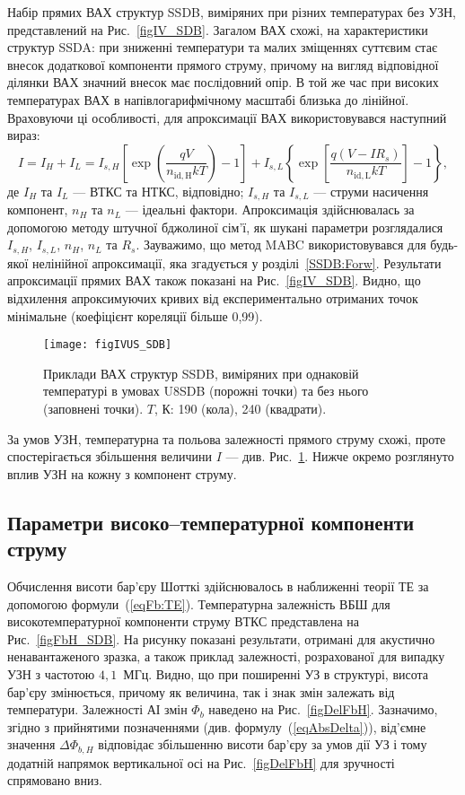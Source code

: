 Набір прямих ВАХ структур  SSDB, виміряних при різних температурах без УЗН, представлений на Рис.~\ref{figIV_SDB}.
Загалом ВАХ схожі, на характеристики структур SSDA:
при зниженні температури та малих зміщеннях суттєвим стає внесок додаткової компоненти прямого струму, причому
на вигляд відповідної ділянки ВАХ значний внесок має послідовний опір.
В той же час при високих температурах ВАХ в напівлогарифмічному масштабі близька до лінійної.
Враховуючи ці особливості, для апроксимації ВАХ використовувався наступний вираз:
\begin{equation}
\label{eqSDB_IV}
  I=I_H+I_L=I_{s,H}\left[\exp\left(\frac{qV}{n_\mathrm{id,H}kT}\right)-1\right]+
 I_{s,L}\left\{\exp\left[\frac{q(V-IR_s)}{n_\mathrm{id,L}kT}\right]-1\right\},
\end{equation}
де
$I_H$ та $I_L$ --- ВТКС та НТКС, відповідно;
$I_{s,H}$ та $I_{s,L}$ --- струми насичення компонент,
$n_{H}$ та $n_{L}$ --- ідеальні фактори.
Апроксимація здійснювалась за допомогою методу штучної бджолиної сім'ї,
як шукані параметри розглядалися $I_{s,H}$, $I_{s,L}$, $n_{H}$, $n_{L}$ та $R_s$.
Зауважимо, що метод MABC використовувався для будь-якої нелінійної апроксимації, яка згадується у розділі~\ref{SSDB:Forw}.
Результати апроксимації прямих ВАХ також показані на Рис.~\ref{figIV_SDB}.
Видно, що відхилення апроксимуючих кривих від експериментально отриманих точок мінімальне
(коефіцієнт кореляції більше 0,99).

\begin{figure}
\center
\texttt{[image: figIVUS\_SDB]}
\caption{\label{figIVUS_SDB}
Приклади ВАХ структур SSDB, виміряних при однаковій температурі в умовах U8SDB (порожні точки) та без нього (заповнені точки).
$T$, К: 190 (кола), 240 (квадрати).
}%
\end{figure}

За умов УЗН, температурна та польова залежності прямого струму схожі,
проте спостерігається збільшення величини $I$ --- див. Рис.~\ref{figIVUS_SDB}.
Нижче окремо розглянуто вплив УЗН на кожну з компонент струму.


\subsection{Параметри високо--температурної компоненти струму}

Обчислення висоти бар'єру Шотткі здійснювалось в наближенні теорії ТЕ за допомогою формули~(\ref{eqFb:TE}).
Температурна залежність ВБШ для високотемпературної компоненти струму ВТКС представлена на Рис.~\ref{figFbH_SDB}.
На рисунку показані результати, отримані для акустично ненавантаженого зразка,
а також приклад залежності, розрахованої для випадку УЗН з частотою $4,1$~МГц.
Видно, що при поширенні УЗ в структурі, висота бар'єру змінюється,
причому як величина, так і знак змін залежать від температури.
Залежності АІ змін $\Phi_{b}$ наведено на Рис.~\ref{figDelFbH}.
Зазначимо, згідно з прийнятими позначеннями (див. формулу~(\ref{eqAbsDelta})),
від'ємне значення $\Delta \Phi_{b,H}$ відповідає збільшенню висоти бар'єру за умов дії УЗ і тому
додатній напрямок вертикальної осі на Рис.~\ref{figDelFbH} для зручності спрямовано вниз.



